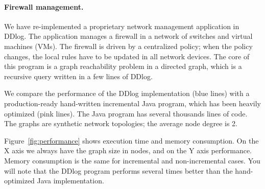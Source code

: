 \paragraph{Firewall management.}

We have re-implemented a proprietary network management application in
DDlog.  The application manages a firewall in a network of switches
and virtual machines (VMs).  The firewall is driven by a centralized
policy; when the policy changes, the local rules have to be updated in
all network devices.  The core of this program is a graph reachability
problem in a directed graph, which is a recursive query written in a
few lines of DDlog.

We compare the performance of the DDlog implementation (blue lines)
with a production-ready hand-written incremental Java program, which
has been heavily optimized (pink lines).  The Java program has several
thousands lines of code.  The graphs are synthetic network topologies;
the average node degree is 2.

Figure~\ref{fig:performance} shows execution time and memory
consumption.  On the X axis we always have the graph size in nodes,
and on the Y axis performance.  Memory consumption is the same for
incremental and non-incremental cases.  You will note that the DDlog
program performs several times better than the hand-optimized Java
implementation.

